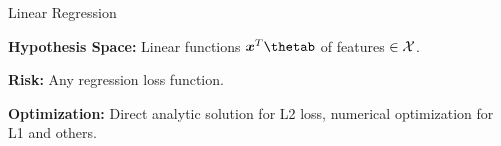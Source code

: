 \documentclass[11pt,compress,t,notes=noshow, xcolor=table]{beamer}
\begin{document}
\begin{frame}{Linear Regression}
\lz

\textbf{Hypothesis Space:} Linear functions $\xv^T\thetab$ of features $\in \mathcal{X}$.\\

\lz

\textbf{Risk:} Any regression loss function.

\lz

\textbf{Optimization:} Direct analytic solution for L2 loss, numerical optimization for L1 and others.

\end{frame}

\endlecture
\end{document}
